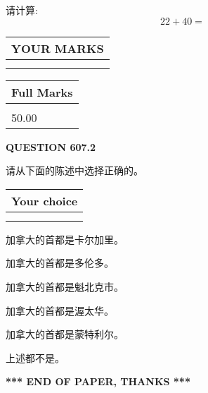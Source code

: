 \documentclass{ctexart}
\begin{document}
  
 
请计算:
\begin{equation}
22 +  %
40 = \nonumber
\end{equation}
 

 

 
  
\vspace{0.2in}
  
\noindent\begin{tabular}{|l|}
\hline
 YOUR MARKS  \\
\hline
 \\ 
 \\ 
\hline
\end{tabular}
\hspace{0.05in} \begin{tabular}{|l|}
\hline
 Full Marks  \\
\hline
 \\ 
50.00 \\
\hline
\end{tabular}
{\textbf{\Large{QUESTION
607.2 
}}}
  
  
请从下面的陈述中选择正确的。
  
  
\noindent\hspace{3.0in} \begin{tabular}{|l|}
\hline
Your choice \\
\hline
 \\ 
 \\ 
\hline
\end{tabular}
  
  
 
 
加拿大的首都是卡尔加里。
 
 
加拿大的首都是多伦多。
 
 
加拿大的首都是魁北克市。
 
 
加拿大的首都是渥太华。
 
 
加拿大的首都是蒙特利尔。
 
 
 上述都不是。
 
 
   
   
 \vspace{0.2in}
 
   
   
   
   
\vspace{1.0in} 
{\textbf{\large{ *** END OF PAPER, THANKS *** }}} 
   
\end{document}
